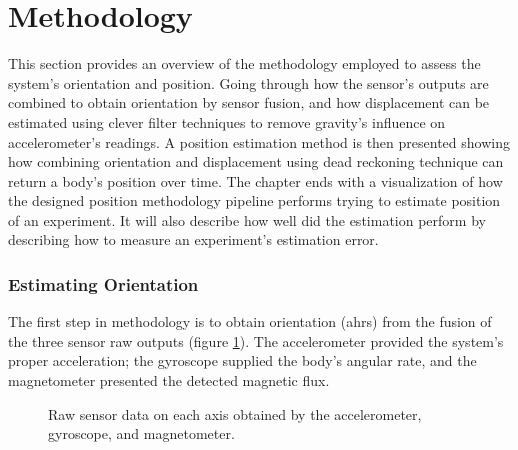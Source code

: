 \section{Methodology}
\label{sub:methodology}

This section provides an overview of the methodology employed to assess the system's orientation and position. Going through how the sensor's outputs are combined to obtain orientation by sensor fusion, and how displacement can be estimated using clever filter techniques to remove gravity's influence on accelerometer's readings. A position estimation method is then presented showing how combining orientation and displacement using dead reckoning technique can return a body's position over time. The chapter ends with a visualization of how the designed position methodology pipeline performs trying to estimate position of an experiment. It will also describe how well did the estimation perform by describing how to measure an experiment's estimation error.


\subsubsection{Estimating Orientation}

The first step in methodology is to obtain orientation (\acrshort{ahrs}) from the fusion of the three sensor raw outputs (figure \ref{fig:raw}). The accelerometer provided the system's proper acceleration; the gyroscope supplied the body's angular rate, and the magnetometer presented the detected magnetic flux.

\begin{figure}[!h]
    \centering
    \resizebox{0.75\linewidth}{!}{}
    \caption{Raw sensor data on each axis obtained by the accelerometer, gyroscope, and magnetometer.}
    \label{fig:raw}
\end{figure}


